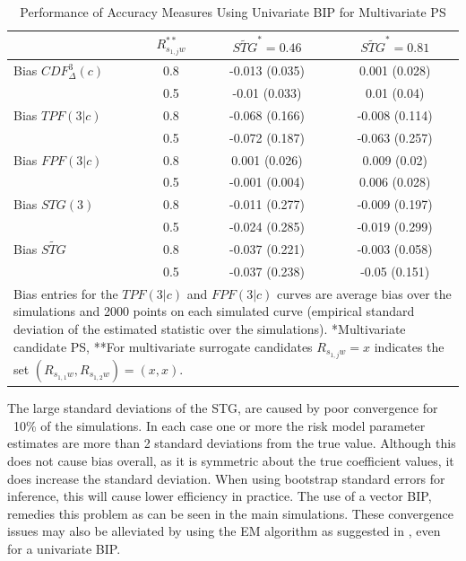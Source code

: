 \documentclass[times, 11pt]{article}
\begin{document}
\begin{table}
\begin{center}
\caption{Performance of Accuracy Measures Using Univariate BIP for Multivariate PS}
\begin{tabular}{lccc}
  \hline
&$R_{s_{1,j}w}^{**}$& $\widetilde{STG}^{*}=0.46$ & $\widetilde{STG}^{*}=0.81$ \\
  \hline
Bias $CDF^{3}_{\Delta}(c)$& 0.8 & -0.013 (0.035)  & 0.001 (0.028)\\ 
 &0.5& -0.01 (0.033)  & 0.01 (0.04) \\ 
Bias $TPF(3|c)$& 0.8& -0.068 (0.166)  & -0.008 (0.114)  \\ 
 &0.5& -0.072 (0.187)  & -0.063 (0.257) \\ 
Bias $FPF(3|c)$& 0.8&  0.001 (0.026) & 0.009 (0.02) \\ 
 &0.5&  -0.001 (0.004)  & 0.006 (0.028) \\ 
Bias $STG(3)$& 0.8& -0.011 (0.277) & -0.009 (0.197)  \\
  &0.5 & -0.024 (0.285)  & -0.019 (0.299) \\ 
Bias $\widetilde{STG}$ & 0.8 & -0.037 (0.221)  & -0.003 (0.058) \\
 & 0.5 & -0.037 (0.238) & -0.05 (0.151)  \\
   \hline
\multicolumn{4}{p{9in}}{Bias entries for the $TPF(3|c)$ and $FPF(3|c)$ curves are average bias over the simulations and 2000 points on each simulated curve (empirical standard deviation of the estimated statistic over the simulations). *Multivariate candidate PS, **For multivariate surrogate candidates $R_{s_{1,j}w}=x$ indicates the set $(R_{s_{1,1}w},R_{s_{1,2}w})=(x,x)$. }
\end{tabular}
\end{center}
\end{table}

The large standard deviations of the STG, are caused by poor convergence for ~10\% of the simulations. In each case one or more the risk model parameter estimates are more than 2 standard deviations from the true value. Although this does not cause bias overall, as it is symmetric about the true coefficient values,  it does increase the standard deviation. When using bootstrap standard errors for inference, this will cause lower efficiency in practice. The use of a vector BIP, remedies this problem as can be seen in the main simulations. These convergence issues may also be alleviated by using the EM algorithm as suggested in \citet{Huang11}, even for a univariate BIP.  
\end{document}
